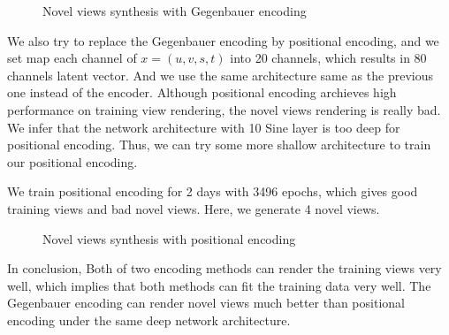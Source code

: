 \documentclass[acmtog]{acmart}
\begin{document}
    \begin{figure}[h]
        \centering
        \quad
        \quad
        \quad
        \caption{Novel views synthesis with Gegenbauer encoding}
    \end{figure}

    \quad We also try to replace the Gegenbauer encoding by positional encoding, and we set map each channel of $x=(u,v,s,t)$ into 20 channels, which results in 80 channels latent vector. And we use the same architecture same as the previous one instead of the encoder. Although positional encoding archieves high performance on training view rendering, the novel views rendering is really bad. We infer that the network architecture with 10 Sine layer is too deep for positional encoding. Thus, we can try some more shallow architecture to train our positional encoding. 
    
    \quad We train positional encoding for 2 days with 3496 epochs, which gives good training views and bad novel views. Here, we generate 4 novel views.
    
   \begin{figure}[h]
        \centering
        \quad
        \quad
        \quad
        \caption{Novel views synthesis with positional encoding}
    \end{figure}

    \quad In conclusion, Both of two encoding methods can render the training views very well, which implies that both methods can fit the training data very well. The Gegenbauer encoding can render novel views much better than positional encoding under the same deep network architecture.
\end{document}
